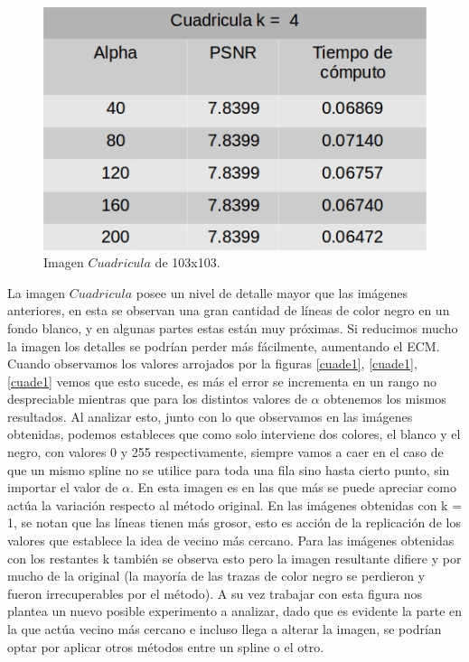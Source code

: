 \documentclass[a4paper]{article}
\newcounter{col}
\begin{document}
    \begin{figure}[H]
    \centering
    \includegraphics[scale=0.4]{imagenes/cua4.jpg}
    \caption{Imagen $Cuadricula$ de 103x103.}
	\label{cuade3}
    \end{figure}
    
La imagen $Cuadricula$ posee un nivel de detalle mayor que las imágenes anteriores, en esta se observan una gran cantidad de líneas de color negro en un fondo blanco, y en algunas partes estas están muy próximas.
 Si reducimos mucho la imagen los detalles se podrían perder más fácilmente, aumentando el ECM. Cuando observamos los valores arrojados por la figuras \ref{cuade1}, \ref{cuade1}, \ref{cuade1} vemos que esto sucede, es más el error se incrementa en un rango no despreciable mientras que para los distintos valores de  $\alpha$ obtenemos los mismos resultados. Al analizar esto, junto con lo que observamos en las imágenes obtenidas, podemos estableces que como solo interviene dos colores, el blanco y el negro, con valores 0 y 255 respectivamente, siempre vamos a caer en el caso de que un mismo spline no se utilice para toda una fila sino hasta cierto punto, sin importar el valor de $\alpha$.
 En esta imagen es en las que más se puede apreciar como actúa la variación respecto al método original. En las imágenes obtenidas con  k = 1, se notan que las líneas tienen más grosor, esto es acción de la replicación de los valores que establece la idea de vecino más cercano. Para las imágenes obtenidas con los restantes k también se observa esto pero la imagen resultante difiere y por mucho de la original (la mayoría de las trazas de color negro se perdieron y fueron irrecuperables por el método). A su vez trabajar con esta figura nos plantea un nuevo posible experimento a analizar, dado que es evidente la parte en la que actúa vecino más cercano e incluso llega a alterar la imagen, se podrían optar por aplicar otros métodos entre un spline o el otro.
\end{document}
